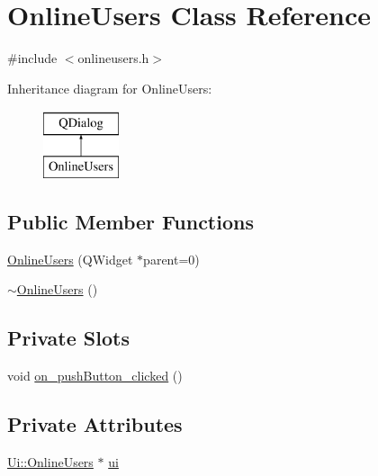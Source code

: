 \hypertarget{classOnlineUsers}{\section{Online\-Users Class Reference}
\label{classOnlineUsers}
}


{\ttfamily \#include $<$onlineusers.\-h$>$}

Inheritance diagram for Online\-Users\-:\begin{figure}[H]
\begin{center}
\leavevmode
\includegraphics[height=2.000000cm]{classOnlineUsers}
\end{center}
\end{figure}
\subsection*{Public Member Functions}
\begin{DoxyCompactItemize}
\item 
\hyperlink{classOnlineUsers_ab59d0a4d612186098c0c5ce5d6cb55a3}{Online\-Users} (Q\-Widget $\ast$parent=0)
\item 
\hyperlink{classOnlineUsers_a44e2ce05617dee30fb400c478dc2c881}{$\sim$\-Online\-Users} ()
\end{DoxyCompactItemize}
\subsection*{Private Slots}
\begin{DoxyCompactItemize}
\item 
void \hyperlink{classOnlineUsers_a8c1c470324bb24678a89ce15f0d010af}{on\-\_\-push\-Button\-\_\-clicked} ()
\end{DoxyCompactItemize}
\subsection*{Private Attributes}
\begin{DoxyCompactItemize}
\item 
\hyperlink{classUi_1_1OnlineUsers}{Ui\-::\-Online\-Users} $\ast$ \hyperlink{classOnlineUsers_a65219d2514073ec680053f792b722887}{ui}
\end{DoxyCompactItemize}


